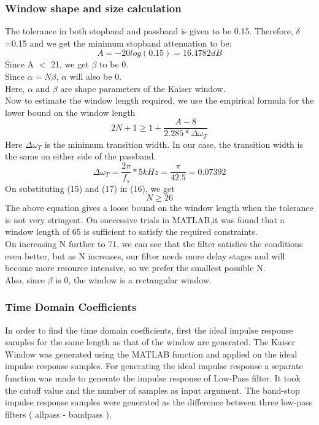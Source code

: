 \documentclass[12pt]{article}
\begin{document}
\subsubsection{Window shape and size calculation}
The tolerance in both stopband and passband is given to be 0.15.
Therefore, $\delta$=0.15 and we get the minimum stopband attenuation to be:
\begin{equation}
    A=-20log(0.15)=16.4782dB
\end{equation}
Since A $<$ 21, we get $\beta$ to be 0.
\\Since $\alpha = N\beta $, $\alpha$ will also be 0.
\\Here, $\alpha$ and $\beta$ are shape parameters of the Kaiser window.
\\Now to estimate the window length required, we use the empirical formula for the lower bound
on the window length
\begin{equation}
    2N+1 \geq 1+\frac{A-8}{2.285*\Delta\omega_T}
\end{equation}
Here $\Delta\omega_T$ is the minimum transition width. In our case, the transition width is the same on either
side of the passband.
\begin{equation}
    \Delta\omega_T=\frac{2\pi}{f_s} * 5kHz= \frac{\pi}{42.5}=0.07392
\end{equation}
On substituting  (15) and (17) in (16), we get
\begin{equation}
    N \geq 26
\end{equation}
The above equation gives a loose bound on the window length when the tolerance is not very
stringent. 
On successive trials in MATLAB,it was found that a window length of 65 is sufficient to satisfy
the required constraints.
\\On increasing N further to 71, we can see that the filter satisfies the conditions even better, but as N increases, our filter needs more delay stages and will become more resource intensive, so we prefer the smallest possible N.
\\Also, since $\beta$ is 0, the window is a
rectangular window.
\subsubsection{Time Domain Coefficients}
In order to find the time domain coefficients, first the ideal impulse response samples for the
same length as that of the window are generated. The Kaiser Window was generated using the
MATLAB function and applied on the ideal impulse response samples. For generating the ideal
impulse response a separate function was made to generate the impulse response of Low-Pass
filter. It took the cutoff value and the number of samples as input argument. The band-stop
impulse response samples were generated as the difference between three low-pass filters ( allpass - bandpass ).
\end{document}
